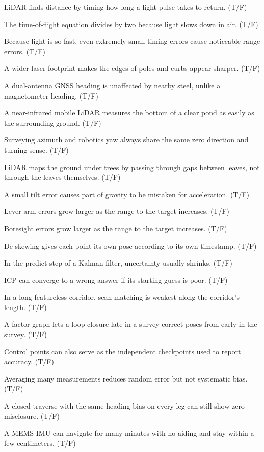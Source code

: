 \item LiDAR finds distance by timing how long a light pulse takes to return. (T/F)
\item The time-of-flight equation divides by two because light slows down in air. (T/F)
\item Because light is so fast, even extremely small timing errors cause noticeable range errors. (T/F)
\item A wider laser footprint makes the edges of poles and curbs appear sharper. (T/F)
\item A dual-antenna GNSS heading is unaffected by nearby steel, unlike a magnetometer heading. (T/F)
\item A near-infrared mobile LiDAR measures the bottom of a clear pond as easily as the surrounding ground. (T/F)
\item Surveying azimuth and robotics yaw always share the same zero direction and turning sense. (T/F)
\item LiDAR maps the ground under trees by passing through gaps between leaves, not through the leaves themselves. (T/F)
\item A small tilt error causes part of gravity to be mistaken for acceleration. (T/F)
\item Lever-arm errors grow larger as the range to the target increases. (T/F)
\item Boresight errors grow larger as the range to the target increases. (T/F)
\item De-skewing gives each point its own pose according to its own timestamp. (T/F)
\item In the predict step of a Kalman filter, uncertainty usually shrinks. (T/F)
\item ICP can converge to a wrong answer if its starting guess is poor. (T/F)
\item In a long featureless corridor, scan matching is weakest along the corridor's length. (T/F)
\item A factor graph lets a loop closure late in a survey correct poses from early in the survey. (T/F)
\item Control points can also serve as the independent checkpoints used to report accuracy. (T/F)
\item Averaging many measurements reduces random error but not systematic bias. (T/F)
\item A closed traverse with the same heading bias on every leg can still show zero misclosure. (T/F)
\item A MEMS IMU can navigate for many minutes with no aiding and stay within a few centimeters. (T/F)
